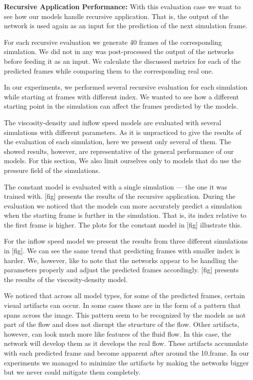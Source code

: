 \documentclass{llncs}
\begin{document}
\noindent\textbf{Recursive Application Performance:}
With this evaluation case we want to see how our models handle recursive application. That is, the output of the network is used again as an input for the prediction of the next simulation frame.

For each recursive evaluation we generate 40 frames of the corresponding simulation. We did not in any was post-processed the output of the networks before feeding it as an input. We calculate the discussed metrics for each of the predicted frames while comparing them to the corresponding real one.

In our experiments, we performed several recursive evaluation for each simulation while starting at frames with different index. We wanted to see how a different starting point in the simulation can affect the frames predicted by the models.

The viscosity-density and inflow speed models are evaluated with several simulations with different parameters. As it is unpracticed to give the results of the evaluation of each simulation, here we present only several of them. The showed results, however, are representative of the general performance of our models. For this section, We also limit ourselves only to models that do use the pressure field of the simulations.

The constant model is evaluated with a single simulation --- the one it was trained with. [fig] presents the results of the recursive application. During the evaluation we noticed that the models can more accurately predict a simulation when the starting frame is further in the simulation. That is, its index relative to the first frame is higher. The plots for the constant model in [fig] illustrate this.

For the inflow speed model we present the results from three different simulations in [fig]. We can see the same trend that predicting frames with smaller index is harder. We, however, like to note that the networks appear to be handling the parameters properly and adjust the predicted frames accordingly. [fig] presents the results of the viscosity-density model.

We noticed that across all model types, for some of the predicted frames, certain visual artifacts can occur. In some cases those are in the form of a pattern that spans across the image. This pattern seem to be recognized by the models as not part of the flow and does not disrupt the structure of the flow. Other artifacts, however, can look much more like features of the fluid flow. In this case, the network will develop them as it develops the real flow. These artifacts accumulate with each predicted frame and become apparent after around the 10.\@ frame. In our experiments we managed to minimize the artifacts by making the networks bigger but we never could mitigate them completely.
\end{document}
